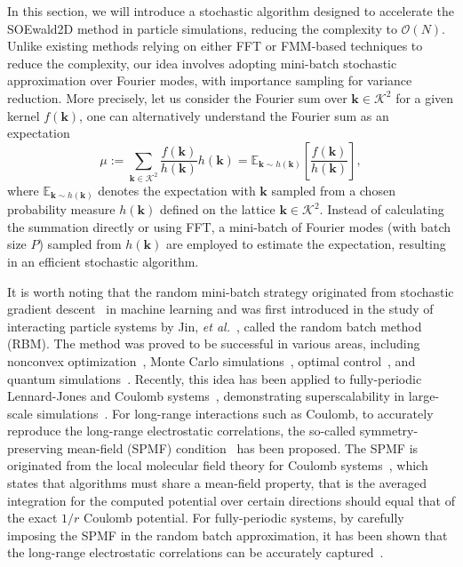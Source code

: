In this section, we will introduce a stochastic algorithm designed to accelerate the SOEwald2D method in particle simulations, reducing the complexity to $\mathcal{O}(N)$. 
Unlike existing methods relying on either FFT or FMM-based techniques to reduce the complexity, our idea involves adopting mini-batch stochastic approximation over Fourier modes, with importance sampling for variance reduction. 
More precisely, let us consider the Fourier sum over $\bm k \in \mathcal{K}^2$ for a given kernel $f(\bm{k})$,
one can alternatively understand the Fourier sum as an expectation
\begin{equation}
	\mu:=\sum_{\bm{k}\in\mathcal{K}^2}\frac{f(\bm{k})}{h(\bm{k})}h(\bm{k})=\mathbb{E}_{\bm k\sim h(\bm{k})}\left[\frac{f(\bm{k})}{h(\bm{k})}\right],
\end{equation}
where $\mathbb{E}_{\bm k\sim h(\bm{k})}$ denotes the expectation with $\bm{k}$ sampled from a chosen probability measure $h(\bm{k})$ defined on the lattice $\bm k \in \mathcal{K}^2$. 
Instead of calculating the summation directly or using FFT, a mini-batch of Fourier modes (with batch size $P$) sampled from $h(\bm{k})$ are employed to estimate the expectation, resulting in an efficient stochastic algorithm.


It is worth noting that the random mini-batch strategy originated from stochastic gradient descent~\cite{robbins1951stochastic} in machine learning and was first introduced in the study of interacting particle systems by Jin, {\it et al.}~\cite{jin2020random}, called the random batch method (RBM).
The method was proved to be successful in various areas, including nonconvex optimization~\cite{ghadimi2016mini}, Monte Carlo simulations~\cite{li2020random}, optimal control~\cite{ko2021model}, and quantum simulations~\cite{jin2021randomquantum}. 
Recently, this idea has been applied to fully-periodic Lennard-Jones and Coulomb systems~\cite{liang2021random, jin2021random, liang2023SISC}, demonstrating superscalability in large-scale simulations~\cite{liang2022superscalability, liang2022improved,gao2024rbmdmoleculardynamicspackage}. 
For long-range interactions such as Coulomb, to accurately reproduce the long-range electrostatic correlations, the so-called symmetry-preserving mean-field (SPMF) condition~\cite{hu2014symmetry} has been proposed. The SPMF is originated from the local molecular field theory for Coulomb systems~\cite{chen2006local, hu2010efficient}, which states that algorithms must share a mean-field property, that is
the averaged integration for the computed potential over certain directions should equal that of the exact $1/r$ Coulomb potential.
For fully-periodic systems, by carefully imposing the SPMF in the random batch approximation, it has been shown that the long-range electrostatic correlations can be accurately captured~\cite{gao2023JCTC}.

